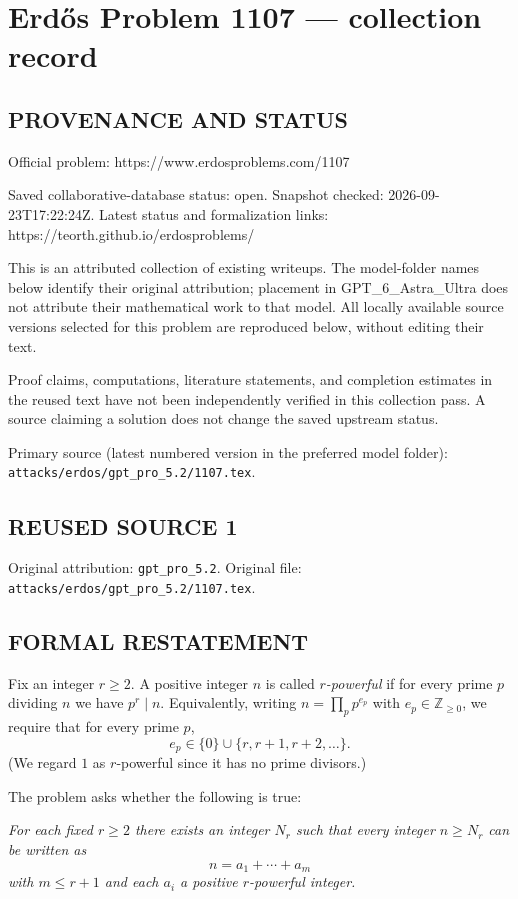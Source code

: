 \section*{Erd\H{o}s Problem 1107 --- collection record}

\subsection*{PROVENANCE AND STATUS}
Official problem: https://www.erdosproblems.com/1107

Saved collaborative-database status: open.
Snapshot checked: 2026-09-23T17:22:24Z.
Latest status and formalization links: https://teorth.github.io/erdosproblems/

This is an attributed collection of existing writeups. The model-folder names below identify their original attribution; placement in GPT\_6\_Astra\_Ultra does not attribute their mathematical work to that model. All locally available source versions selected for this problem are reproduced below, without editing their text.

Proof claims, computations, literature statements, and completion estimates in the reused text have not been independently verified in this collection pass. A source claiming a solution does not change the saved upstream status.

Primary source (latest numbered version in the preferred model folder): \texttt{attacks/erdos/gpt\_pro\_5.2/1107.tex}.

\subsection*{REUSED SOURCE 1}
Original attribution: \texttt{gpt\_pro\_5.2}.
Original file: \texttt{attacks/erdos/gpt\_pro\_5.2/1107.tex}.


\subsection*{FORMAL RESTATEMENT}
Fix an integer $r\ge 2$. A positive integer $n$ is called \emph{$r$-powerful} if for every prime $p$ dividing $n$ we have $p^r\mid n$.
Equivalently, writing $n=\prod_{p} p^{e_p}$ with $e_p\in\mathbb{Z}_{\ge 0}$, we require that for every prime $p$,
\[e_p\in\{0\}\cup\{r,r+1,r+2,\dots\}.\]
(We regard $1$ as $r$-powerful since it has no prime divisors.)

The problem asks whether the following is true:

\emph{For each fixed $r\ge 2$ there exists an integer $N_r$ such that every integer $n\ge N_r$ can be written as}
\[n=a_1+\cdots+a_m\]
\emph{with $m\le r+1$ and each $a_i$ a positive $r$-powerful integer.}

